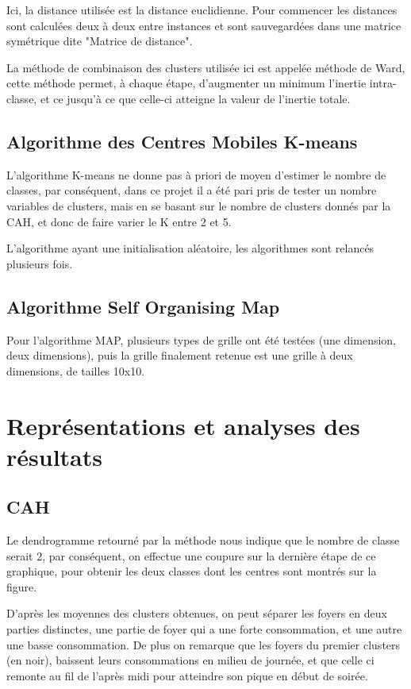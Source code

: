 \documentclass[a4paper,titlepage,12pt]{report}
\begin{document}
			Ici, la distance utilisée est la distance euclidienne. Pour commencer les distances sont calculées deux à deux entre instances et sont sauvegardées dans une matrice symétrique dite "Matrice de distance".
			
			La méthode de combinaison des clusters utilisée ici est appelée méthode de Ward, cette méthode permet, à chaque étape, d’augmenter un minimum l'inertie intra-classe, et ce jusqu'à ce que celle-ci atteigne la valeur de l'inertie totale.
			
		\subsection{Algorithme des Centres Mobiles K-means}
			L'algorithme K-means ne donne pas à priori de moyen d'estimer le nombre de classes, par conséquent, dans ce projet il a été pari pris de tester un nombre variables de clusters, mais en se basant sur le nombre de clusters donnés par la CAH, et donc de faire varier le K entre 2 et 5.
			
			L'algorithme ayant une initialisation aléatoire, les algorithmes sont relancés plusieurs fois. 
		
		\subsection{Algorithme Self Organising Map}
			Pour l'algorithme MAP, plusieurs types de grille ont été testées (une dimension, deux dimensions), puis la grille finalement retenue est une grille à deux dimensions, de tailles 10x10.
									
	\section{Représentations et analyses des résultats}
		\subsection{CAH}
			Le dendrogramme retourné par la méthode nous indique que le nombre de classe serait 2, par conséquent, on effectue une coupure sur la dernière étape de ce graphique, pour obtenir les deux classes dont les centres sont montrés sur la figure.
		
			D'après les moyennes des clusters obtenues, on peut séparer les foyers en deux parties distinctes, une partie de foyer qui a une forte consommation, et une autre une basse consommation. De plus on remarque que les foyers du premier clusters (en noir), baissent leurs consommations en milieu de journée, et que celle ci remonte au fil de l'après midi pour atteindre son pique en début de soirée.
		
\end{document}
